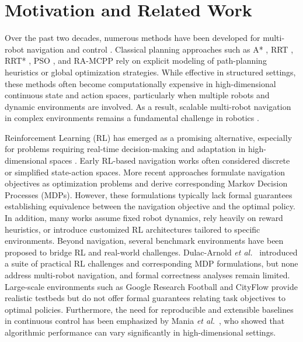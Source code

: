 \documentclass[letterpaper, 10 pt, conference]{ieeeconf}  %
\begin{document}
\section{Motivation and Related Work}
\label{sec:related}

Over the past two decades, numerous methods have been developed for multi-robot navigation and control \cite{nafis2021, sam2005, mickey2021}. Classical planning approaches such as A* \cite{goto2003}, RRT \cite{rodriguez2006rrt}, RRT* \cite{karaman2011rrts}, PSO \cite{nafis2021}, and RA-MCPP \cite{mickey2021} rely on explicit modeling of path-planning heuristics or global optimization strategies. While effective in structured settings, these methods often become computationally expensive in high-dimensional continuous state and action spaces, particularly when multiple robots and dynamic environments are involved. As a result, scalable multi-robot navigation in complex environments remains a fundamental challenge in robotics \cite{Sunderhauf2018ijrr, ibarz2021ijrr, zhang2023multi, cai2022multi, osooli2024multi}.

Reinforcement Learning (RL) has emerged as a promising alternative, especially for problems requiring real-time decision-making and adaptation in high-dimensional spaces \cite{kober2014, chen2017icra, everett2018iros, bae2019as, tang2025, dulacArnold2021, ibarz2021ijrr}. Early RL-based navigation works \cite{kober2014, bae2019as} often considered discrete or simplified state-action spaces. More recent approaches \cite{chen2017icra, everett2018iros, long2017iral, fan2020ijrr, han2022iral} formulate navigation objectives as optimization problems and derive corresponding Markov Decision Processes (MDPs). However, these formulations typically lack formal guarantees establishing equivalence between the navigation objective and the optimal policy. In addition, many works assume fixed robot dynamics, rely heavily on reward heuristics, or introduce customized RL architectures tailored to specific environments. Beyond navigation, several benchmark environments have been proposed to bridge RL and real-world challenges. Dulac-Arnold \textit{et al.}~\cite{dulacArnold2021} introduced a suite of practical RL challenges and corresponding MDP formulations, but none address multi-robot navigation, and formal correctness analyses remain limited. Large-scale environments such as Google Research Football \cite{kurach2020google} and CityFlow \cite{zhang2019cityflow} provide realistic testbeds but do not offer formal guarantees relating task objectives to optimal policies. Furthermore, the need for reproducible and extensible baselines in continuous control has been emphasized by Mania \textit{et al.}~\cite{mania2018ars}, who showed that algorithmic performance can vary significantly in high-dimensional settings.
\end{document}
